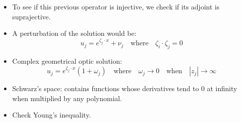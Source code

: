 \documentclass{article}
\begin{document}
\begin{itemize}
    \item To see if this previous operator is injective, we check if its adjoint is suprajective.

    \item A perturbation of the solution would be:
    \begin{equation}
        u_j = e^{\zeta_j \cdot x} + \nu_j \quad \text{where} \quad \zeta_i \cdot \zeta_j = 0
    \end{equation}

    \item Complex geometrical optic solution:
    \begin{equation}
        u_j = e^{\zeta_j \cdot x}(1 + \omega_j) \quad \text{where} \quad \omega_j \rightarrow 0 \quad \text{when} \quad |z_j| \rightarrow \infty
    \end{equation}

    \item Schwarz's space: contains functions whose derivatives tend to 0 at infinity when multiplied by any polynomial.

    \item Check Young's inequality.
\end{itemize}


\end{document}

